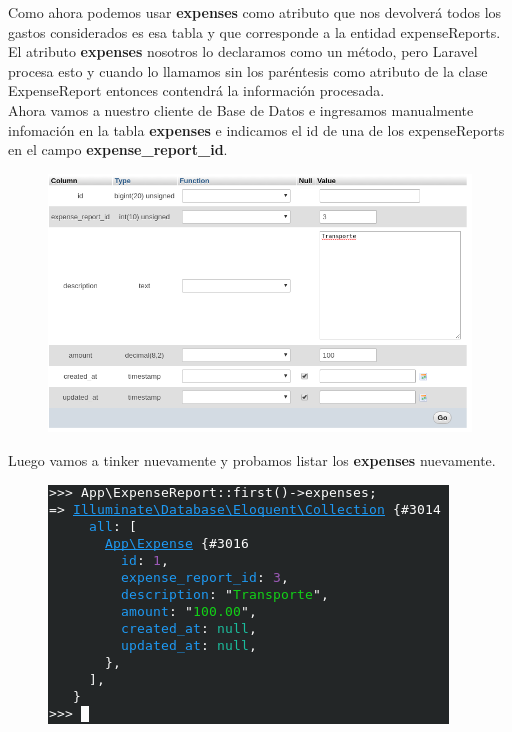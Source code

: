 \documentclass{article}
\begin{document}
\newpage

Como ahora podemos usar \textbf{expenses} como atributo que nos devolverá todos
los gastos considerados es esa tabla y que corresponde a la entidad
expenseReports.\\

El atributo \textbf{expenses} nosotros lo declaramos como un método, pero
Laravel procesa esto y cuando lo llamamos sin los paréntesis como atributo de
la clase ExpenseReport entonces contendrá la información procesada.\\

Ahora vamos a nuestro cliente de Base de Datos e ingresamos manualmente
infomación en la tabla \textbf{expenses} e indicamos el id de una de los
expenseReports en el campo \textbf{expense\_report\_id}.

\begin{figure}[h!]
  \centering
  \includegraphics[scale=0.6]{./Pictures/107_expenses_insert_manual.png}
\end{figure}

Luego vamos a tinker nuevamente y probamos listar los \textbf{expenses}
nuevamente.

\begin{figure}[h!]
  \centering
  \includegraphics[scale=0.75]{./Pictures/108_expenses_ok.png}
\end{figure}
\end{document}
